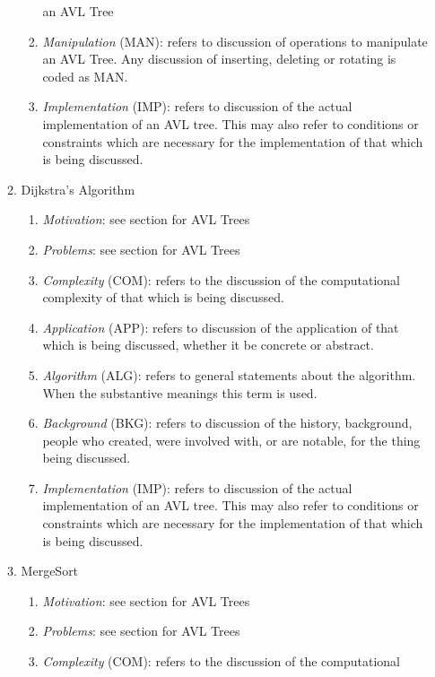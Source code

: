 \documentclass[conference]{IEEEtran}
\begin{document}
\begin{enumerate}[M1.]
\begin{enumerate}
\begin{enumerate}
            an AVL Tree
          \item \emph{Manipulation} (MAN): refers to discussion of operations to
            manipulate an AVL Tree. Any discussion of inserting, deleting or
            rotating is coded as MAN.
          \item \emph{Implementation} (IMP): refers to discussion of the actual
            implementation of an AVL tree. This may also refer to conditions or
            constraints which are necessary for the implementation of that which
            is being discussed.
        \end{enumerate}
      \item{Dijkstra's Algorithm}
        \begin{enumerate}
          \item \emph{Motivation}: see section for AVL Trees
          \item \emph{Problems}: see section for AVL Trees
          \item \emph{Complexity} (COM): refers to the discussion of the computational
            complexity of that which is being discussed. 
          \item \emph{Application} (APP): refers to discussion of the application of
            that which is being discussed, whether it be concrete or abstract.
          \item \emph{Algorithm} (ALG): refers to general statements about the
            algorithm. When the 
            substantive meanings this term is used.
          \item \emph{Background} (BKG): refers to discussion of the history,
            background, people who created, were involved with, or are notable,
            for the thing being discussed.
          \item \emph{Implementation} (IMP): refers to discussion of the actual
            implementation of an AVL tree. This may also refer to conditions or
            constraints which are necessary for the implementation of that which
            is being discussed.
        \end{enumerate}
      \item{MergeSort}
        \begin{enumerate}
          \item \emph{Motivation}: see section for AVL Trees
          \item \emph{Problems}: see section for AVL Trees
          \item \emph{Complexity} (COM): refers to the discussion of the computational

\end{enumerate}
\end{enumerate}
\end{enumerate}
\end{document}
